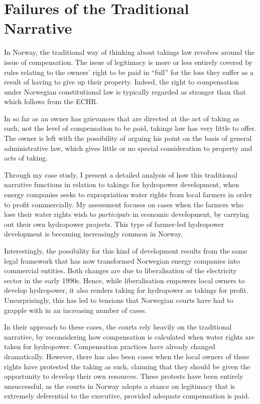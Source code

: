 \section{Failures of the Traditional Narrative}

In Norway, the traditional way of thinking about takings law revolves around the issue of compensation. The issue of legitimacy is more or less entirely covered by rules relating to the owners' right to be paid in ``full'' for the loss they suffer as a result of having to give up their property. Indeed, the right to compensation under Norwegian constitutional law is typically regarded as stronger than that which follows from the ECHR.

In so far as an owner has grievances that are directed at the act of taking as such, not the level of compensation to be paid, takings law has very little to offer. The owner is left with the possibility of arguing his point on the basis of general administrative law, which gives little or no special consideration to property and acts of taking. 

Through my case study, I present a detailed analysis of how this traditional narrative functions in relation to takings for hydropower development, when energy companies seeks to expropriation water rights from local farmers in order to profit commercially. My assessment focuses on cases when the farmers who lose their water rights wish to {\it participate} in economic development, by carrying out their own hydropower projects. This type of farmer-led hydropower development is becoming increasingly common in Norway.

Interestingly, the possibility for this kind of development results from the same legal framework that has now transformed Norwegian energy companies into commercial entities. Both changes are due to liberalisation of the electricity sector in the early 1990s. Hence, while liberalisation empowers local owners to develop hydropower, it also renders taking for hydropower as takings for profit. Unsurprisingly, this has led to tensions that Norwegian courts have had to grapple with in an increasing number of cases.

In their approach to these cases, the courts rely heavily on the traditional narrative, by reconsidering how compensation is calculated when water rights are taken for hydropower. Compensation practices have already changed dramatically. However, there has also been cases when the local owners of these rights have protested the taking as such, claiming that they should be given the opportunity to develop their own resources. These protests have been entirely unsuccessful, as the courts in Norway adopts a stance on legitimacy that is extremely deferential to the executive, provided adequate compensation is paid.

